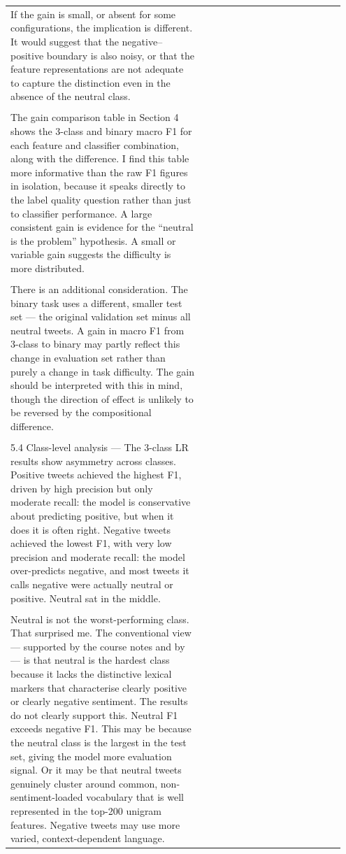 \documentclass[11pt]{article}
\begin{document}
\begin{longtable}{|p{0.55\linewidth}|p{0.40\linewidth}|}
\hline
\rule{0pt}{3.5cm} & \\
\hline
If the gain is small, or absent for some configurations, the implication is different. It would suggest that the negative--positive boundary is also noisy, or that the feature representations are not adequate to capture the distinction even in the absence of the neutral class. & \\[2pt]
\hline
\rule{0pt}{3.5cm} & \\
\hline
The gain comparison table in Section 4 shows the 3-class and binary macro F1 for each feature and classifier combination, along with the difference. I find this table more informative than the raw F1 figures in isolation, because it speaks directly to the label quality question rather than just to classifier performance. A large consistent gain is evidence for the ``neutral is the problem'' hypothesis. A small or variable gain suggests the difficulty is more distributed. & \\[2pt]
\hline
\rule{0pt}{3.5cm} & \\
\hline
There is an additional consideration. The binary task uses a different, smaller test set --- the original validation set minus all neutral tweets. A gain in macro F1 from 3-class to binary may partly reflect this change in evaluation set rather than purely a change in task difficulty. The gain should be interpreted with this in mind, though the direction of effect is unlikely to be reversed by the compositional difference. & \\[2pt]
\hline
\rule{0pt}{3.5cm} & \\
\hline
5.4 Class-level analysis --- The 3-class LR results show asymmetry across classes. Positive tweets achieved the highest F1, driven by high precision but only moderate recall: the model is conservative about predicting positive, but when it does it is often right. Negative tweets achieved the lowest F1, with very low precision and moderate recall: the model over-predicts negative, and most tweets it calls negative were actually neutral or positive. Neutral sat in the middle. & \\[2pt]
\hline
\rule{0pt}{3.5cm} & \\
\hline
Neutral is not the worst-performing class. That surprised me. The conventional view --- supported by the course notes and by --- is that neutral is the hardest class because it lacks the distinctive lexical markers that characterise clearly positive or clearly negative sentiment. The results do not clearly support this. Neutral F1 exceeds negative F1. This may be because the neutral class is the largest in the test set, giving the model more evaluation signal. Or it may be that neutral tweets genuinely cluster around common, non-sentiment-loaded vocabulary that is well represented in the top-200 unigram features. Negative tweets may use more varied, context-dependent language. & \\[2pt]

\end{longtable}
\end{document}
